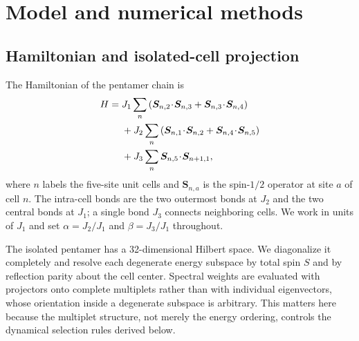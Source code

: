 \section{Model and numerical methods}
\label{sec:methods}

\subsection{Hamiltonian and isolated-cell projection}

The Hamiltonian of the pentamer chain is
\begin{align}
H={}&J_1\sum_n\left(\bm S_{n,2}\!\cdot\!\bm S_{n,3}
 +\bm S_{n,3}\!\cdot\!\bm S_{n,4}\right) \notag\\
&+J_2\sum_n\left(\bm S_{n,1}\!\cdot\!\bm S_{n,2}
 +\bm S_{n,4}\!\cdot\!\bm S_{n,5}\right) \notag\\
&+J_3\sum_n\bm S_{n,5}\!\cdot\!\bm S_{n+1,1},
\label{eq:hamiltonian}
\end{align}
where $n$ labels the five-site unit cells and $\bm S_{n,a}$ is the spin-$1/2$
operator at site $a$ of cell $n$.
The intra-cell bonds are the two outermost bonds at $J_2$ and the two central
bonds at $J_1$; a single bond $J_3$ connects neighboring cells.
We work in units of $J_1$ and set $\alpha=J_2/J_1$ and $\beta=J_3/J_1$ throughout.

The isolated pentamer has a 32-dimensional Hilbert space.
We diagonalize it completely and resolve each degenerate energy subspace by total
spin $S$ and by reflection parity about the cell center.
Spectral weights are evaluated with projectors onto complete multiplets rather
than with individual eigenvectors, whose orientation inside a degenerate subspace
is arbitrary.
This matters here because the multiplet structure, not merely the energy
ordering, controls the dynamical selection rules derived below.

